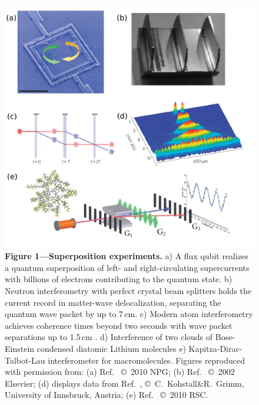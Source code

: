 \documentclass[11pt]{article}
\begin{document}
\begin{figure}
\includegraphics[width=1.04\columnwidth]{Fig1-arxiv.pdf}
\small{\bfseries\sffamily Figure 1---Superposition experiments.}
a) A flux qubit realizes a quantum superposition of left- and right-circulating supercurrents\cite{Friedman2000_long} with billions of 
electrons contributing to the quantum state. 
b) Neutron interferometry with perfect crystal beam splitters holds the current record in matter-wave delocalization\cite{Zawisky2002}, separating the 
quantum wave packet by up to 7\,cm.  
c) Modern atom interferometry achieves coherence times beyond two seconds with wave packet separations up to 1.5\,cm  \cite{Muentinga2013,Dickerson2013,Dimopoulos2007}.
d) Interference of two clouds of Bose-Einstein condensed diatomic Lithium molecules \cite{Kohstall2011}
e) Kapitza-Dirac-Talbot-Lau interferometer for macromolecules\cite{Gerlich2007,Tuexen2010,Eibenberger2013}.
Figures reproduced with permission from: ({a}) Ref.\  \copyright\  2010 NPG; ({b}) Ref.\  \copyright\ 2002 Elsevier; ({d}) displays data from Ref.\ , \copyright\ C.~Kohstall\&R.~Grimm, University of Innsbruck, Austria; ({e}) Ref.\  \copyright\ 2010 RSC.
\end{figure} 
\end{document}
